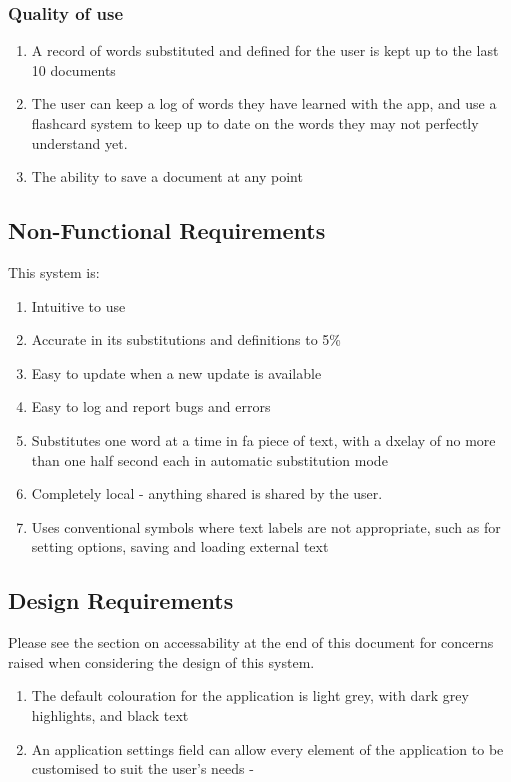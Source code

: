 \documentclass{article}
\begin{document}
\subsubsection{Quality of use}

\begin{enumerate}
\item A record of words substituted and defined for the user is kept up to the last 10 documents
\item The user can keep a log of words they have learned with the app, and use a flashcard system to keep up to date on the words they may not perfectly understand yet.
\item The ability to save a document at any point
\end{enumerate}

\subsection{Non-Functional Requirements}
This system is:
\begin{enumerate}
\item Intuitive to use
\item Accurate in its substitutions and definitions to 5\%
\item Easy to update when a new update is available
\item Easy to log and report bugs and errors
\item Substitutes one word at a time in fa piece of text, with a dxelay of no more than one half second each in automatic substitution mode
\item Completely local - anything shared is shared by the user. 
\item Uses conventional symbols where text labels are not appropriate, such as for setting options, saving and loading external text
\end{enumerate}

\subsection{Design Requirements}
Please see the section on accessability at the end of this document for concerns raised when considering the design of this system.
\begin{enumerate}
\item The default colouration for the application is light grey, with dark grey highlights, and black text
\item An application settings field can allow every element of the application to be customised to suit the user's needs - 
\end{enumerate}
\end{document}
